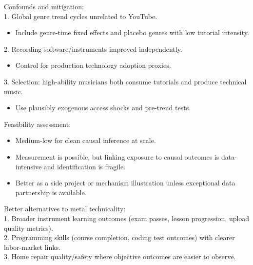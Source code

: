 \documentclass[11pt]{article}
\begin{document}
Confounds and mitigation:\\
1. Global genre trend cycles unrelated to YouTube.\\
\begin{itemize}
\item Include genre-time fixed effects and placebo genres with low tutorial intensity.
\end{itemize}
2. Recording software/instruments improved independently.\\
\begin{itemize}
\item Control for production technology adoption proxies.
\end{itemize}
3. Selection: high-ability musicians both consume tutorials and produce technical music.\\
\begin{itemize}
\item Use plausibly exogenous access shocks and pre-trend tests.
\end{itemize}

Feasibility assessment:\\
\begin{itemize}
\item Medium-low for clean causal inference at scale.
\item Measurement is possible, but linking exposure to causal outcomes is data-intensive and identification is fragile.
\item Better as a side project or mechanism illustration unless exceptional data partnership is available.
\end{itemize}

Better alternatives to metal technicality:\\
1. Broader instrument learning outcomes (exam passes, lesson progression, upload quality metrics).\\
2. Programming skills (course completion, coding test outcomes) with clearer labor-market links.\\
3. Home repair quality/safety where objective outcomes are easier to observe.\\
\end{document}
